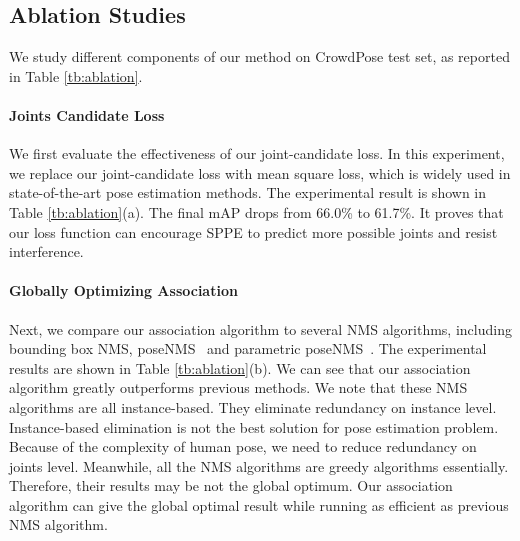 \documentclass[10pt,twocolumn,letterpaper]{article}
\begin{document}
\subsection{Ablation Studies}
We study different components of our method on CrowdPose test set, as reported in Table \ref{tb:ablation}.
\iffalse

\paragraph{SPPE Structure}
To validate our proposed SPPE structure, a comparative experiment is conducted. In our experiment, we only remove our SPPE and replace it with the comparative model from~\cite{msra}. The comparative model uses ResNet-101 as backbone and three deconvolution layers to upsample. We keep loss function and association algorithm the same. We can observe performance degradation when removing , which implies that our SPPE structure performs better in human feature extraction.
\fi

\vspace{-0.15in}
\paragraph{Joints Candidate Loss}
We first evaluate the effectiveness of our joint-candidate loss. In this experiment, we replace our joint-candidate loss with mean square loss, which is widely used in state-of-the-art pose estimation methods. The experimental result is shown in Table \ref{tb:ablation}(a). The final mAP drops from 66.0\% to 61.7\%. It proves that our loss function can encourage SPPE to predict more possible joints and resist interference.

\vspace{-0.1in}
\paragraph{Globally Optimizing Association}
Next, we compare our association algorithm to several NMS algorithms, including bounding box NMS, poseNMS~\cite{nms1, nms2} and parametric poseNMS~\cite{alphapose}. The experimental results are shown in Table \ref{tb:ablation}(b). We can see that our association algorithm greatly outperforms previous methods. We note that these NMS algorithms are all instance-based. They eliminate redundancy on instance level. Instance-based elimination is not the best solution for pose estimation problem. Because of the complexity of human pose, we need to reduce redundancy on joints level. Meanwhile, all the NMS algorithms are greedy algorithms essentially. Therefore, their results may be not the global optimum. Our association algorithm can give the global optimal result while running as efficient as previous NMS algorithm.
\end{document}
